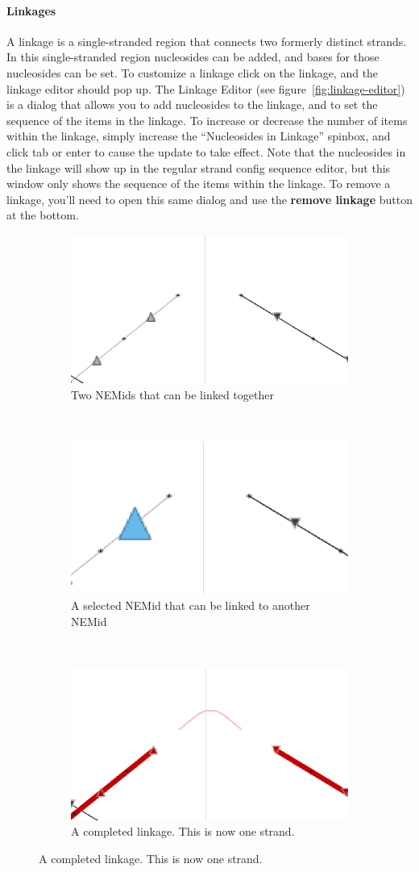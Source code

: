 \documentclass[titlepage]{article}
\begin{document}
\paragraph{Linkages}
A linkage is a single-stranded region that connects two formerly distinct strands. In this single-stranded region nucleosides can be added, and bases for those nucleosides can be set. To customize a linkage click on the linkage, and the linkage editor should pop up. The Linkage Editor (see figure~\ref{fig:linkage-editor}) is a dialog that allows you to add nucleosides to the linkage, and to set the sequence of the items in the linkage. To increase or decrease the number of items within the linkage, simply increase the ``Nucleosides in Linkage'' spinbox, and click tab or enter to cause the update to take effect. Note that the nucleosides in the linkage will show up in the regular strand config sequence editor, but this window only shows the sequence of the items within the linkage. To remove a linkage, you'll need to open this same dialog and use the \textbf{remove linkage} button at the bottom.

\begin{figure}[h] \label{fig:linkage-creation-process}
	\centering
	\caption{Linkage creation process}
	
	\begin{subfigure}{.3\linewidth} \label{fig:nick}
		\centering
		\includegraphics[height=.6in]{pre-linkage.png}
		\caption{Two NEMids that can be linked together}
	\end{subfigure}%
	~
	\begin{subfigure}{.3\linewidth} \label{fig:nick}
		\centering
		\includegraphics[height=.6in]{pre-linkage-1.png}
		\caption{A selected NEMid that can be linked to another NEMid}
	\end{subfigure}%
	~
	\begin{subfigure}{.3\linewidth} \label{fig:end-of-strand-nick}
		\centering
		\includegraphics[height=.6in]{linked.png}
		\caption{A completed linkage. This is now one strand.}
	\end{subfigure}
\end{figure}
\end{document}
